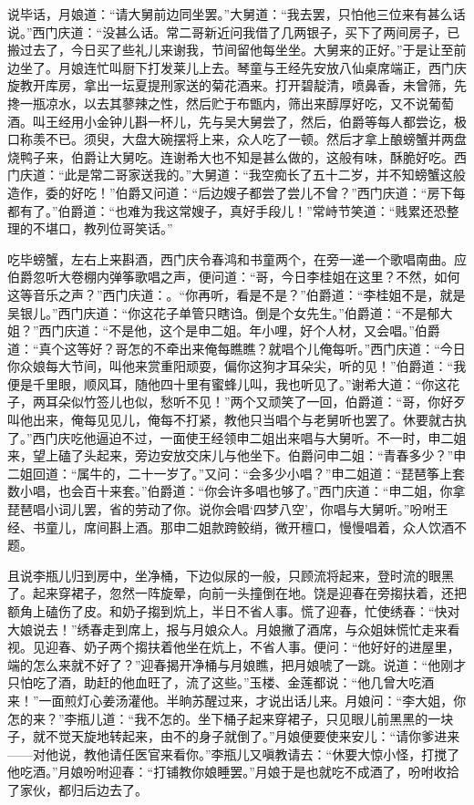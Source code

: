 说毕话，月娘道：“请大舅前边同坐罢。”大舅道：“我去罢，只怕他三位来有甚么话说。”西门庆道：“没甚么话。常二哥新近问我借了几两银子，买下了两间房子，已搬过去了，今日买了些礼儿来谢我，节间留他每坐坐。大舅来的正好。”于是让至前边坐了。月娘连忙叫厨下打发莱儿上去。琴童与王经先安放八仙桌席端正，西门庆旋教开库房，拿出一坛夏提刑家送的菊花酒来。打开碧靛清，喷鼻香，未曾筛，先搀一瓶凉水，以去其蓼辣之性，然后贮于布甑内，筛出来醇厚好吃，又不说葡萄酒。叫王经用小金钟儿斟一杯儿，先与吴大舅尝了，然后，伯爵等每人都尝讫，极口称羡不已。须臾，大盘大碗摆将上来，众人吃了一顿。然后才拿上酿螃蟹并两盘烧鸭子来，伯爵让大舅吃。连谢希大也不知是甚么做的，这般有味，酥脆好吃。西门庆道：“此是常二哥家送我的。”大舅道：“我空痴长了五十二岁，并不知螃蟹这般造作，委的好吃！”伯爵又问道：“后边嫂子都尝了尝儿不曾？”西门庆道：“房下每都有了。”伯爵道：“也难为我这常嫂子，真好手段儿！”常峙节笑道：“贱累还恐整理的不堪口，教列位哥笑话。”

吃毕螃蟹，左右上来斟酒，西门庆令春鸿和书童两个，在旁一递一个歌唱南曲。应伯爵忽听大卷棚内弹筝歌唱之声，便问道：“哥，今日李桂姐在这里？不然，如何这等音乐之声？”西门庆道：。“你再听，看是不是？”伯爵道：“李桂姐不是，就是吴银儿。”西门庆道：“你这花子单管只瞎诌。倒是个女先生。”伯爵道：“不是郁大姐？”西门庆道：“不是他，这个是申二姐。年小哩，好个人材，又会唱。”伯爵道：“真个这等好？哥怎的不牵出来俺每瞧瞧？就唱个儿俺每听。”西门庆道：“今日你众娘每大节间，叫他来赏重阳顽耍，偏你这狗才耳朵尖，听的见！”伯爵道：“我便是千里眼，顺风耳，随他四十里有蜜蜂儿叫，我也听见了。”谢希大道：“你这花子，两耳朵似竹签儿也似，愁听不见！”两个又顽笑了一回，伯爵道：“哥，你好歹叫他出来，俺每见见儿，俺每不打紧，教他只当唱个与老舅听也罢了。休要就古执了。”西门庆吃他逼迫不过，一面使王经领申二姐出来唱与大舅听。不一时，申二姐来，望上磕了头起来，旁边安放交床儿与他坐下。伯爵问申二姐：“青春多少？”申二姐回道：“属牛的，二十一岁了。”又问：“会多少小唱？”申二姐道：“琵琶筝上套数小唱，也会百十来套。”伯爵道：“你会许多唱也够了。”西门庆道：“申二姐，你拿琵琶唱小词儿罢，省的劳动了你。说你会唱‘四梦八空’，你唱与大舅听。”吩咐王经、书童儿，席间斟上酒。那申二姐款跨鲛绡，微开檀口，慢慢唱着，众人饮酒不题。

且说李瓶儿归到房中，坐净桶，下边似尿的一般，只顾流将起来，登时流的眼黑了。起来穿裙子，忽然一阵旋晕，向前一头撞倒在地。饶是迎春在旁搊扶着，还把额角上磕伤了皮。和奶子搊到炕上，半日不省人事。慌了迎春，忙使绣春：“快对大娘说去！”绣春走到席上，报与月娘众人。月娘撇了酒席，与众姐妹慌忙走来看视。见迎春、奶子两个搊扶着他坐在炕上，不省人事。便问：“他好好的进屋里，端的怎么来就不好了？”迎春揭开净桶与月娘瞧，把月娘唬了一跳。说道：“他刚才只怕吃了酒，助赶的他血旺了，流了这些。”玉楼、金莲都说：“他几曾大吃酒来！”一面煎灯心姜汤灌他。半晌苏醒过来，才说出话儿来。月娘问：“李大姐，你怎的来？”李瓶儿道：“我不怎的。坐下桶子起来穿裙子，只见眼儿前黑黑的一块子，就不觉天旋地转起来，由不的身子就倒了。”月娘便要使来安儿：“请你爹进来——对他说，教他请任医官来看你。”李瓶儿又嗔教请去：“休要大惊小怪，打搅了他吃酒。”月娘吩咐迎春：“打铺教你娘睡罢。”月娘于是也就吃不成酒了，吩咐收拾了家伙，都归后边去了。

